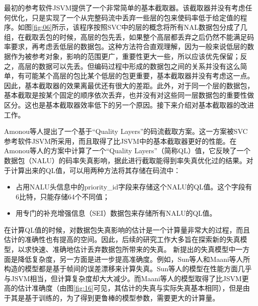 最初的参考软件JSVM提供了一个非常简单的基本截取器。该截取器并没有考虑任何优化，只是实现了一个从完整码流中丢弃一些层的包来使码率低于给定值的程序。如图\ref{fig:06}\supercite{Amonou2007}所示，该程序按照SVC中的层的概念将所有NAL数据包分成了几组，在截取丢包的时候，高层的包先丢，如果整个高层都丢弃之后仍然不能满足码率要求，再考虑丢低层的数据包。这种方法符合直观理解，因为一般来说低层的数据作为被参考对象，影响的范围更广，重要性更大一些，所以应该优先保留；反之，高层的数据可以先丢。但编码过程中形成的数据包之间的关系并没有这么简单，有可能某个高层的包比某个低层的包更重要，基本截取器并没有考虑这一点。因此，基本截取器的效果离最优还有很大的差距。此外，对于同一个层的数据包，基本截取是按某个固定的顺序依次丢弃，也并没有对这些同一层数据包的重要性做区分。这也是基本截取器效率低下的另一个原因。接下来介绍对基本截取器的改进工作。

Amonou等人\supercite{Amonou2007}提出了一个基于“Quality Layers”的码流截取方案。这一方案被SVC参考软件JSVM所采用，而且取得了比JSVM中的基本截取器更好的性能。在Amonou等人的方案中计算了一个“Quality Layers”（简称QL）值，它反映了一个数据包（NALU）的码率失真影响，据此进行截取能得到率失真优化过的结果。对于计算出来的QL值，可以用两种方法将其存储在码流中：

\begin{itemize}
\item 占用NALU头信息中的priority\_id字段来存储这个NALU的QL值。这个字段有6比特，只能存储64个不同值；
\item 用专门的补充增强信息（SEI）数据包来存储所有NALU的QL值。
\end{itemize}

在计算QL值的时候，对数据包失真影响的估计是一个计算量非常大的过程，而且估计的准确性也有提高的空间。因此，后续的研究工作大多旨在探索新的失真模型，以求快速、准确地估计丢弃数据包所带来的失真。
新提出的失真模型中一方面是降低复杂度，另一方面是进一步提高准确度。例如，Sun等人\supercite{Sun2009}和Maani等人\supercite{Maani2009}所构造的模型都是基于帧间的误差漂移来计算失真。Sun等人的模型在性能方面几乎与JSVM相当，但计算复杂度却大大减少。而Maani等人的模型取得了比JSVM更高的估计准确度（由图\ref{fig:16}\supercite{Maani2009}可见，其估计的失真与实际失真基本相同），但是由于其是基于训练的，为了得到更鲁棒的模型参数，需要更大的计算量。

